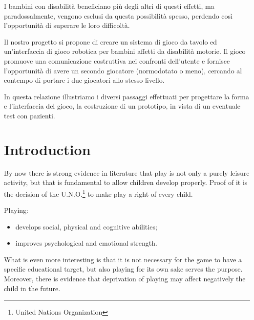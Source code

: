 \documentclass[a4paper,twoside]{book}
\begin{document}
I bambini con disabilit\`{a} beneficiano pi\`{u} degli altri di questi effetti, ma paradossalmente, vengono esclusi da questa possibilit\`{a} spesso, perdendo cos\`{i} l'opportunit\`{a} di superare le loro difficolt\`{a}.

Il nostro progetto si propone di creare un sistema di gioco da tavolo ed un'interfaccia di gioco robotica per bambini affetti da disabilit\`{a} motorie. Il gioco promuove una comunicazione costruttiva nei confronti dell'utente e fornisce l'opportunit\`{a} di avere un secondo giocatore (normodotato o meno), cercando al contempo di portare i due giocatori allo stesso livello.

In questa relazione illustriamo i diversi passaggi effettuati per progettare la forma e l'interfaccia del gioco, la costruzione di un prototipo, in vista di un eventuale test con pazienti.
 
\chapter{Introduction}

By now there is strong evidence in literature that play is not only a purely leisure activity, but that is fundamental to allow children develop properly. Proof of it is the decision of the U.N.O.\footnote{United Nations Organization} to make play a right of every child. 

\beforelist Playing:
\begin{itemize}
\item develops social, physical and cognitive abilities;
\item  improves psychological and emotional strength.
\end{itemize}
\afterlist*
What is even more interesting is that it is not necessary for the game to have a specific educational target, but also playing for its own sake serves the purpose. Moreover, there is evidence that  deprivation of playing may affect negatively the child in the future.
\end{document}
